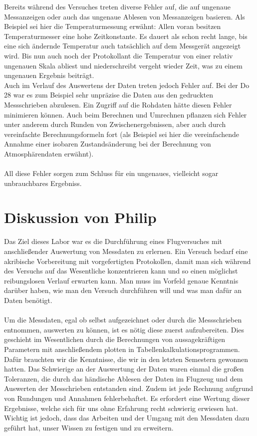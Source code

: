 Bereits während des Versuches treten diverse Fehler auf, die auf ungenaue Messanzeigen oder auch das ungenaue Ablesen von Messanzeigen basieren. Als Beispiel sei hier die Temperaturmessung erwähnt: Allen voran besitzen Temperaturmesser eine hohe Zeitkonstante. Es dauert als schon recht lange, bis eine sich ändernde Temperatur auch tatsächlich auf dem Messgerät angezeigt wird. Bis nun auch noch der Protokollant die Temperatur von einer relativ ungenauen Skala abliest und niederschreibt vergeht wieder Zeit, was zu einem ungenauen Ergebnis beiträgt.\\
Auch im Verlauf des Auswertens der Daten treten jedoch Fehler auf. Bei der Do 28 war es zum Beispiel sehr unpräzise die Daten aus den gedruckten Messschrieben abzulesen. Ein Zugriff auf die Rohdaten hätte diesen Fehler minimieren können. Auch beim Berechnen und Umrechnen pflanzen sich Fehler unter anderem durch Runden von Zwischenergebnissen, aber auch durch vereinfachte Berechnungsformeln fort (als Beispiel sei hier die vereinfachende Annahme einer isobaren Zustandsänderung bei der Berechnung von Atmosphärendaten erwähnt).\\\\
All diese Fehler sorgen zum Schluss für ein ungenaues, vielleicht sogar unbrauchbares Ergebniss.

\newpage

\section{Diskussion von Philip}
Das Ziel dieses Labor war es die Durchführung eines Flugversuches mit anschließender Auswertung von Messdaten zu erlernen. Ein Versuch bedarf eine akribische Vorbereitung mit vorgefertigten Protokollen, damit man sich während des Versuchs auf das Wesentliche konzentrieren kann und so einen möglichst reibungslosen Verlauf erwarten kann. Man muss im Vorfeld genaue Kenntnis darüber haben, wie man den Versuch durchführen will und was man dafür an Daten benötigt. \\\\
Um die Messdaten, egal ob selbst aufgezeichnet oder durch die Messschrieben entnommen, auswerten zu können, ist es nötig diese zuerst aufzubereiten. Dies geschieht im Wesentlichen durch die Berechnungen von aussagekräftigen Parametern mit anschließendem plotten in Tabellenkalkulationsprogrammen. Dafür brauchten wir die Kenntnisse, die wir in den letzten Semestern gewonnen hatten. Das Schwierige an der Auswertung der Daten waren einmal die großen Toleranzen, die durch das händische Ablesen der Daten im Flugzeug und dem Auswerten der Messchrieben entstanden sind. Zudem ist jede Rechnung aufgrund von Rundungen und Annahmen fehlerbehaftet. Es erfordert eine Wertung dieser Ergebnisse, welche sich für uns ohne Erfahrung recht schwierig erwiesen hat. Wichtig ist jedoch, dass das Arbeiten und der Umgang mit den Messdaten dazu geführt hat, unser Wissen zu festigen und zu erweitern.\\\\


